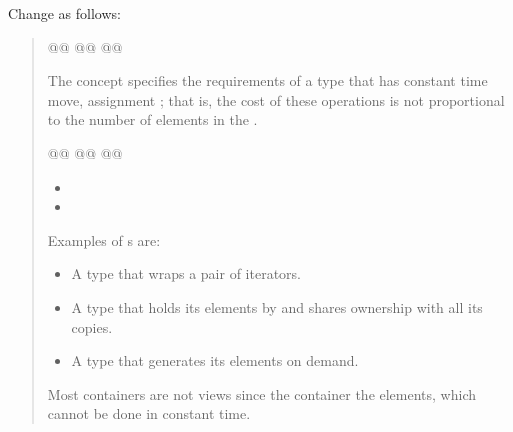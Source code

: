Change  as follows:
\begin{quote}
\begin{codeblock}
@@
  @@
    @@
\end{codeblock}

\pnum
The  concept specifies the requirements of a  type
that has constant time  move,
 assignment ; that is,
the cost of these operations is not proportional to
the number of elements in the .

\begin{codeblock}
@@
  @@
    @@
\end{codeblock}

\pnum
{}
\begin{itemize}
\item
\item
\end{itemize}

\pnum
\begin{example}
Examples of s are:

\begin{itemize}
\item A  type that wraps a pair of iterators.

\item A  type that holds its elements by 
and shares ownership with all its copies.

\item A  type that generates its elements on demand.
\end{itemize}

Most containers are not views since
 the container  the
elements, which cannot be done in constant time.
\end{example}
\end{quote}

